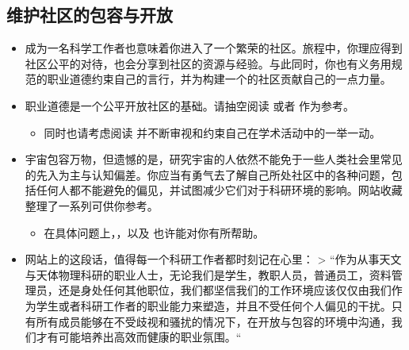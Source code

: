 \documentclass[letterpaper,10pt,english]{sphinxmanual}
\begin{document}
\subsection{维护社区的包容与开放}
\label{\detokenize{resource/research/getting_started_cn:id3}}\begin{itemize}
\item {} 
成为一名科学工作者也意味着你进入了一个繁荣的社区。旅程中，你理应得到社区公平的对待，也会分享到社区的资源与经验。与此同时，你也有义务用规范的职业道德约束自己的言行，并为构建一个的社区贡献自己的一点力量。

\item {} 
职业道德是一个公平开放社区的基础。请抽空阅读
或者
作为参考。
\begin{itemize}
\item {} 
同时也请考虑阅读
并不断审视和约束自己在学术活动中的一举一动。

\end{itemize}

\item {} 
宇宙包容万物，但遗憾的是，研究宇宙的人依然不能免于一些人类社会里常见的先入为主与认知偏差。你应当有勇气去了解自己所处社区中的各种问题，包括任何人都不能避免的偏见，并试图减少它们对于科研环境的影响。网站收藏整理了一系列可供你参考。
\begin{itemize}
\item {} 
在具体问题上，，以及
也许能对你有所帮助。

\end{itemize}

\item {} 
网站上的这段话，值得每一个科研工作者都时刻记在心里：
\textgreater{}
“作为从事天文与天体物理科研的职业人士，无论我们是学生，教职人员，普通员工，资料管理员，还是身处任何其他职位，我们都坚信我们的工作环境应该仅仅由我们作为学生或者科研工作者的职业能力来塑造，并且不受任何个人偏见的干扰。只有所有成员能够在不受歧视和骚扰的情况下，在开放与包容的环境中沟通，我们才有可能培养出高效而健康的职业氛围。“

\end{itemize}
\end{document}
